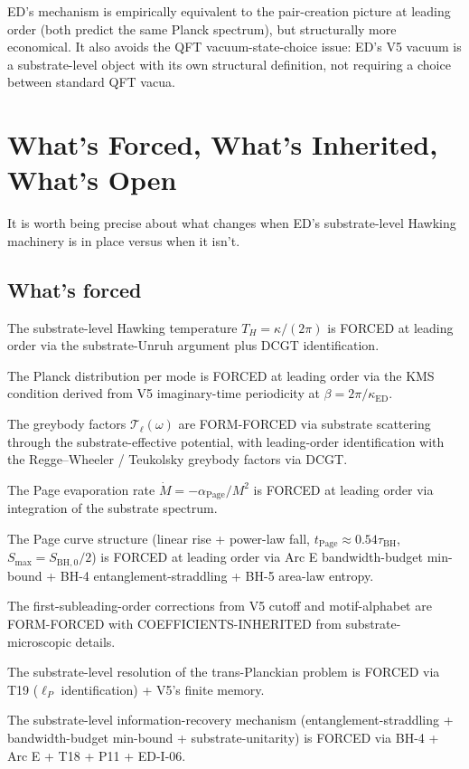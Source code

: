 \documentclass[11pt,a4paper]{article}
\begin{document}
ED's mechanism is empirically equivalent to the pair-creation picture at leading order (both predict the same Planck spectrum), but structurally more economical. It also avoids the QFT vacuum-state-choice issue: ED's V5 vacuum is a substrate-level object with its own structural definition, not requiring a choice between standard QFT vacua.

\section{What's Forced, What's Inherited, What's Open}

It is worth being precise about what changes when ED's substrate-level Hawking machinery is in place versus when it isn't.

\subsection{What's forced}

The substrate-level Hawking temperature $T_H = \kappa/(2\pi)$ is FORCED at leading order via the substrate-Unruh argument plus DCGT identification.

The Planck distribution per mode is FORCED at leading order via the KMS condition derived from V5 imaginary-time periodicity at $\beta = 2\pi/\kappa_{\mathrm{ED}}$.

The greybody factors $\mathcal{T}_\ell(\omega)$ are FORM-FORCED via substrate scattering through the substrate-effective potential, with leading-order identification with the Regge--Wheeler / Teukolsky greybody factors via DCGT.

The Page evaporation rate $\dot M = -\alpha_{\mathrm{Page}}/M^2$ is FORCED at leading order via integration of the substrate spectrum.

The Page curve structure (linear rise + power-law fall, $t_{\mathrm{Page}} \approx 0.54\tau_{\mathrm{BH}}$, $S_{\max} = S_{\mathrm{BH},0}/2$) is FORCED at leading order via Arc E bandwidth-budget min-bound + BH-4 entanglement-straddling + BH-5 area-law entropy.

The first-subleading-order corrections from V5 cutoff and motif-alphabet are FORM-FORCED with COEFFICIENTS-INHERITED from substrate-microscopic details.

The substrate-level resolution of the trans-Planckian problem is FORCED via T19 ($\ell_P$ identification) + V5's finite memory.

The substrate-level information-recovery mechanism (entanglement-straddling + bandwidth-budget min-bound + substrate-unitarity) is FORCED via BH-4 + Arc E + T18 + P11 + ED-I-06.
\end{document}
